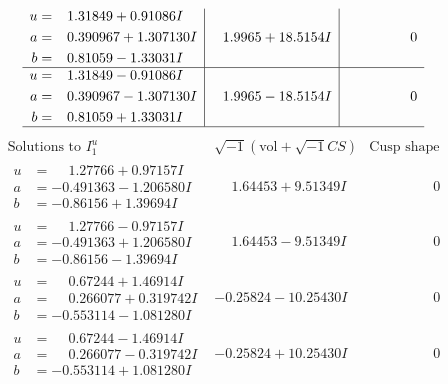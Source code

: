 \documentclass[1p]{elsarticle_modified}
\theoremstyle{definition}
\newcommand{\I}{\sqrt{-1}}
\begin{document}
$$\begin{array}{c|c|c}
\begin{aligned}
u &= \phantom{-}1.31849 + 0.91086 I \\
a &= \phantom{-}0.390967 + 1.307130 I \\
b &= \phantom{-}0.81059 - 1.33031 I\end{aligned}
 & \phantom{-}1.9965 + 18.5154 I & \phantom{-0.000000 } 0 \\ \hline\begin{aligned}
u &= \phantom{-}1.31849 - 0.91086 I \\
a &= \phantom{-}0.390967 - 1.307130 I \\
b &= \phantom{-}0.81059 + 1.33031 I\end{aligned}
 & \phantom{-}1.9965 - 18.5154 I & \phantom{-0.000000 } 0\\
 \hline 
 \end{array}$$\newpage$$\begin{array}{c|c|c}  
\text{Solutions to }I^u_{1}& \I (\text{vol} + \sqrt{-1}CS) & \text{Cusp shape}\\
 \hline 
\begin{aligned}
u &= \phantom{-}1.27766 + 0.97157 I \\
a &= -0.491363 - 1.206580 I \\
b &= -0.86156 + 1.39694 I\end{aligned}
 & \phantom{-}1.64453 + 9.51349 I & \phantom{-0.000000 } 0 \\ \hline\begin{aligned}
u &= \phantom{-}1.27766 - 0.97157 I \\
a &= -0.491363 + 1.206580 I \\
b &= -0.86156 - 1.39694 I\end{aligned}
 & \phantom{-}1.64453 - 9.51349 I & \phantom{-0.000000 } 0 \\ \hline\begin{aligned}
u &= \phantom{-}0.67244 + 1.46914 I \\
a &= \phantom{-}0.266077 + 0.319742 I \\
b &= -0.553114 - 1.081280 I\end{aligned}
 & -0.25824 - 10.25430 I & \phantom{-0.000000 } 0 \\ \hline\begin{aligned}
u &= \phantom{-}0.67244 - 1.46914 I \\
a &= \phantom{-}0.266077 - 0.319742 I \\
b &= -0.553114 + 1.081280 I\end{aligned}
 & -0.25824 + 10.25430 I & \phantom{-0.000000 } 0 \\ \hline\begin{aligned}

\end{aligned}
\end{array}$$
\end{document}
